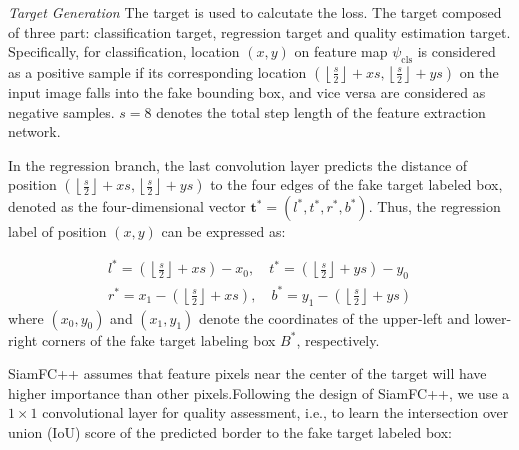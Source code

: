 \documentclass[journal]{IEEEtran}
\begin{document}
\textit{Target Generation} The target is used to calcutate the loss. The target composed of three part: classification target, regression target and quality estimation target. Specifically, for classification, location $(x,y)$ on feature map $\psi_{\mathrm{cls}}$ is considered as a positive sample if its corresponding location $\left(\left\lfloor\frac{s}{2}\right\rfloor+x s,\left\lfloor\frac{s}{2}\right\rfloor+y s\right)$ on the input image falls into the fake bounding box, and vice versa are considered as negative samples. $s=8$ denotes the total step length of the feature extraction network.

In the regression branch, the last convolution layer predicts the distance of position $\left(\left\lfloor\frac{s}{2}\right\rfloor+x s,\left\lfloor\frac{s}{2}\right\rfloor+y s\right)$ to the four edges of the fake target labeled box, denoted as the four-dimensional vector $\boldsymbol{t}^{*}=\left(l^{*}, t^{*}, r^{*}, b^{*}\right)$. Thus, the regression label of position $(x,y)$ can be expressed as:

\begin{equation}
  \begin{array}{ll}
  l^{*}=\left(\left\lfloor\frac{s}{2}\right\rfloor+x s\right)-x_{0}, \quad t^{*}=\left(\left\lfloor\frac{s}{2}\right\rfloor+y s\right)-y_{0} \\
  r^{*}=x_{1}-\left(\left\lfloor\frac{s}{2}\right\rfloor+x s\right), \quad b^{*}=y_{1}-\left(\left\lfloor\frac{s}{2}\right\rfloor+y s\right)
  \end{array}
\end{equation}
where $(x_0, y_0)$ and $(x_1, y_1)$ denote the coordinates of the upper-left and lower-right corners of the fake target labeling box $B^*$, respectively.

SiamFC++ assumes that feature pixels near the center of the target will have higher importance than other pixels.Following the design of SiamFC++, we use a $1 \times 1$ convolutional layer for quality assessment, i.e., to learn the intersection over union (IoU) score of the predicted border to the fake target labeled box:
\end{document}

